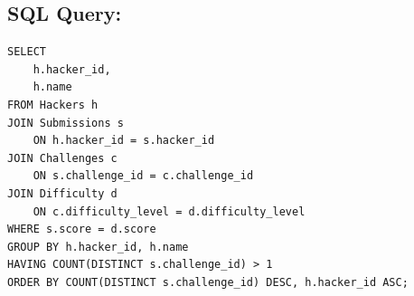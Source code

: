 \documentclass[12pt,a4paper]{article}
\begin{document}
\subsection*{SQL Query: }
\begin{lstlisting}[style=sqlstyle]
SELECT 
    h.hacker_id,
    h.name
FROM Hackers h
JOIN Submissions s 
    ON h.hacker_id = s.hacker_id
JOIN Challenges c
    ON s.challenge_id = c.challenge_id
JOIN Difficulty d
    ON c.difficulty_level = d.difficulty_level
WHERE s.score = d.score
GROUP BY h.hacker_id, h.name
HAVING COUNT(DISTINCT s.challenge_id) > 1
ORDER BY COUNT(DISTINCT s.challenge_id) DESC, h.hacker_id ASC;
\end{lstlisting}
\end{document}
